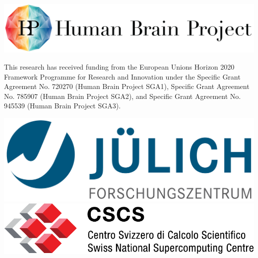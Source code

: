 \documentclass[aspectratio=43]{beamer}
\begin{document}
\begin{frame}[fragile]{}
    \begin{center}
        \includegraphics[height=0.15\textwidth]{logos/HBP_logo.jpg}
        \\ \vfill

        This research has received funding from the European Unions Horizon 2020 Framework Programme for Research and
        Innovation under the Specific Grant Agreement No. 720270 (Human Brain Project SGA1), Specific Grant Agreement
        No. 785907 (Human Brain Project SGA2), and Specific Grant Agreement No. 945539 (Human Brain Project SGA3).
        \\ \vfill

        \includegraphics[height=0.1\textwidth]{logos/julich_logo.pdf}
        \hspace{1cm}
        \includegraphics[height=0.09\textwidth]{logos/cscs_logo.pdf}
    \end{center}

\end{frame}
\end{document}
